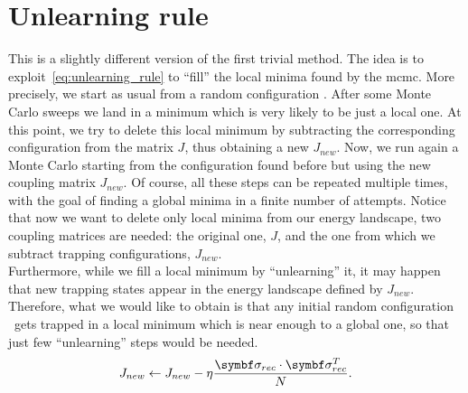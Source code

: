 \documentclass[\rootdir/main.tex]{subfiles}
\begin{document}
\section{Unlearning rule}
This is a slightly different version of the first trivial method. The idea is to exploit~\cref{eq:unlearning_rule} to ``fill'' the local minima found by the \acrlong{mcmc}. More precisely, we start as usual from a random configuration \bsigma. After some Monte Carlo sweeps we land in a minimum which is very likely to be just a local one. At this point, we try to delete this local minimum by subtracting the corresponding configuration from the matrix $J$, thus obtaining a new $J_{new}$. Now, we run again a Monte Carlo starting from the configuration found before but using the new coupling matrix $J_{new}$. Of course, all these steps can be repeated multiple times, with the goal of finding a global minima in a finite number of attempts. Notice that now we want to delete only local minima from our energy landscape, two coupling matrices are needed: the original one, \ie $J$, and the one from which we subtract trapping configurations, \ie $J_{new}$.\\
Furthermore, while we fill a local minimum by ``unlearning'' it, it may happen that new trapping states appear in the energy landscape defined by $J_{new}$. Therefore, what we would like to obtain is that any initial random configuration \bsigma\ gets trapped in a local minimum which is near enough to a global one, so that just few ``unlearning'' steps would be needed.
\begin{equation}\label{eq:unlearning_eta}
    J_{new} \gets J_{new} - \eta \frac{\bsigma_{rec} \cdot \bsigma_{rec}^{T}}{N}.
\end{equation}
\end{document}
